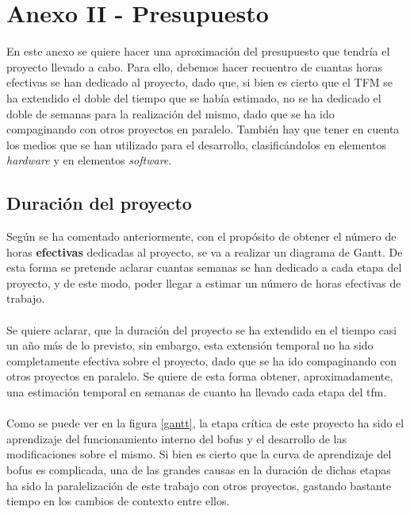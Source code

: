 \chapter{Anexo II - Presupuesto}

En este anexo se quiere hacer una aproximación del presupuesto que tendría el proyecto llevado a cabo. Para ello, debemos hacer recuentro de cuantas horas efectivas se han dedicado al proyecto, dado que, si bien es cierto que el TFM se ha extendido el doble del tiempo que se había estimado, no se ha dedicado el doble de semanas para la realización del mismo, dado que se ha ido compaginando con otros proyectos en paralelo. También hay que tener en cuenta los medios que se han utilizado para el desarrollo, clasificándolos en elementos \textit{hardware} y en elementos \textit{software}.

\section{Duración del proyecto}


Según se ha comentado anteriormente, con el propósito de obtener el número de horas \textbf{efectivas} dedicadas al proyecto, se va a realizar un diagrama de Gantt. De esta forma se pretende aclarar cuantas semanas se han dedicado a cada etapa del proyecto, y de este modo, poder llegar a estimar un número de horas efectivas de trabajo.\\
\\
Se quiere aclarar, que la duración del proyecto se ha extendido en el tiempo casi un año más de lo previsto, sin embargo, esta extensión temporal no ha sido completamente efectiva sobre el proyecto, dado que se ha ido compaginando con otros proyectos en paralelo. Se quiere de esta forma obtener, aproximadamente, una estimación temporal en semanas de cuanto ha llevado cada etapa del \gls{tfm}.\\
\\
Como se puede ver en la figura \ref{gantt}, la etapa crítica de este proyecto ha sido el aprendizaje del funcionamiento interno del \gls{bofus} y el desarrollo de las modificaciones sobre el mismo. Si bien es cierto que la curva de aprendizaje del \gls{bofus} es complicada, una de las grandes causas en la duración de dichas etapas ha sido la paralelización de este trabajo con otros proyectos, gastando bastante tiempo en los cambios de contexto entre ellos.\\

